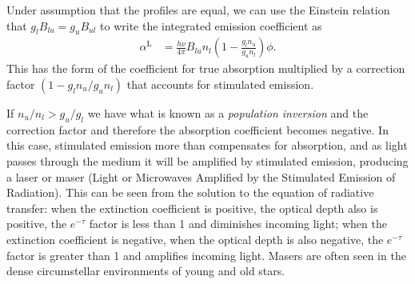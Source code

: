 
Under assumption that the profiles are equal, we can use the Einstein relation that $g_l B_{lu} = g_u
B_{ul}$ to write the integrated emission coefficient as
\begin{align}
\alpha^\mathrm{L} &= \frac{h\nu}{4\pi} B_{lu} n_l \left(1 - 
\frac{g_l n_u}{g_u n_l}\right) \phi.
\end{align}
This has the form of the coefficient for true absorption
multiplied by a correction factor $(1 - 
g_l n_u/g_u n_l)$ that accounts for
stimulated emission. 

If $n_u/n_l > g_u/g_l$ we have what is known as a 
\emph{population inversion} and the correction factor and therefore the absorption coefficient
becomes negative. In this case, stimulated emission more
than compensates for absorption, and as light passes through
the medium it will be amplified by stimulated emission,
producing a laser or maser (Light or Microwaves Amplified by
the Stimulated Emission of Radiation). This can be seen from
the solution to the equation of radiative transfer: when the
extinction coefficient is positive, the optical depth also
is positive, the $e^{-\tau}$ factor is less than 1 and
diminishes incoming light; when the extinction coefficient
is negative, when the optical depth is also negative, the
$e^{-\tau}$ factor is greater than 1 and amplifies incoming
light. Masers are often seen in the dense circumstellar
environments of young and old stars.

